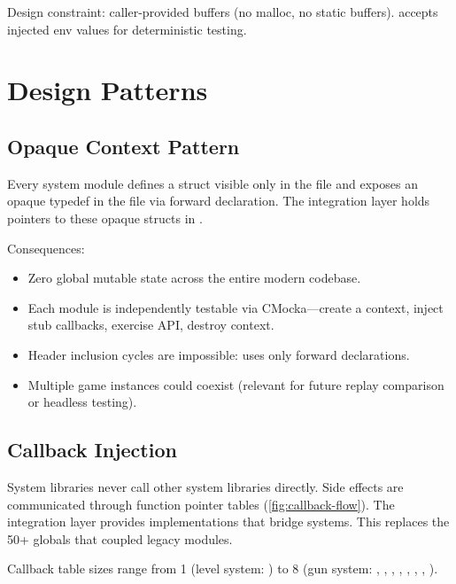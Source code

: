 \documentclass[11pt,a4paper]{article}
\begin{document}
Design constraint: caller-provided buffers (no malloc, no static buffers).  accepts injected env values for deterministic testing.


\section{Design Patterns}
\label{sec:patterns}

\subsection{Opaque Context Pattern}
\label{sec:opaque-context}

Every system module defines a struct visible only in the  file and exposes an opaque typedef in the  file via forward declaration. The integration layer holds pointers to these opaque structs in .

Consequences:
\begin{itemize}[nosep]
    \item Zero global mutable state across the entire modern codebase.
    \item Each module is independently testable via CMocka---create a context, inject stub callbacks, exercise API, destroy context.
    \item Header inclusion cycles are impossible:  uses only forward declarations.
    \item Multiple game instances could coexist (relevant for future replay comparison or headless testing).
\end{itemize}

\subsection{Callback Injection}
\label{sec:callback-injection}

System libraries never call other system libraries directly. Side effects are communicated through function pointer tables (\cref{fig:callback-flow}). The integration layer provides implementations that bridge systems. This replaces the 50+  globals that coupled legacy modules.

Callback table sizes range from 1 (level system: ) to 8 (gun system: , , , , , , , ).
\end{document}
